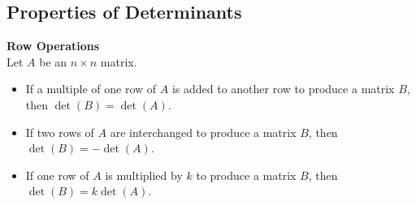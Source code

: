 \documentclass[10pt, a4paper]{article}
\begin{document}
\subsection{Properties of Determinants}
\begin{proposition}
    \textbf{Row Operations}\\
    Let $A$ be an $n\times n$ matrix.
    \begin{itemize}
        \item If a multiple of one row of $A$ is added to another row to produce a matrix $B$, then $\det(B) = \det(A)$.
        \item If two rows of $A$ are interchanged to produce a matrix $B$, then $\det(B) = -\det(A)$.
        \item If one row of $A$ is multiplied by $k$ to produce a matrix $B$, then $\det(B) = k\det(A)$.
    \end{itemize}
\end{proposition}
    
\end{document}
